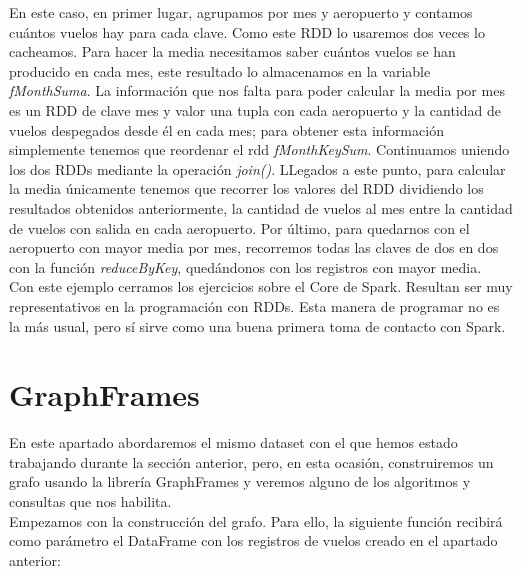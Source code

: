 En este caso, en primer lugar, agrupamos por mes y aeropuerto y contamos cuántos vuelos hay para cada clave. Como este RDD lo usaremos dos veces lo cacheamos. Para hacer la media necesitamos saber cuántos vuelos se han producido en cada mes, este resultado lo almacenamos en la variable \textit{fMonthSuma}. La información que nos falta para poder calcular la media por mes es un RDD de clave mes y valor una tupla con cada aeropuerto y la cantidad de vuelos despegados desde él en cada mes; para obtener esta información simplemente tenemos que reordenar el rdd \textit{fMonthKeySum}. Continuamos uniendo los dos RDDs mediante la operación \textit{join()}. LLegados a este punto, para calcular la media únicamente tenemos que recorrer los valores del RDD dividiendo los resultados obtenidos anteriormente, la cantidad de vuelos al mes entre la cantidad de vuelos con salida en cada aeropuerto. Por último, para quedarnos con el aeropuerto con mayor media por mes, recorremos todas las claves de dos en dos con la función \textit{reduceByKey}, quedándonos con los registros con mayor media.\\

Con este ejemplo cerramos los ejercicios sobre el Core de Spark. Resultan ser muy representativos en la programación con RDDs. Esta manera de programar no es la más usual, pero sí sirve como una buena primera toma de contacto con Spark.\\

\section{GraphFrames}

En este apartado abordaremos el mismo dataset con el que hemos estado trabajando durante la sección anterior, pero, en esta ocasión, construiremos un grafo usando la librería GraphFrames y veremos alguno de los algoritmos y consultas que nos habilita.\\

Empezamos con la construcción del grafo. Para ello, la siguiente función recibirá como parámetro el DataFrame con los registros de vuelos creado en el apartado anterior:\\


